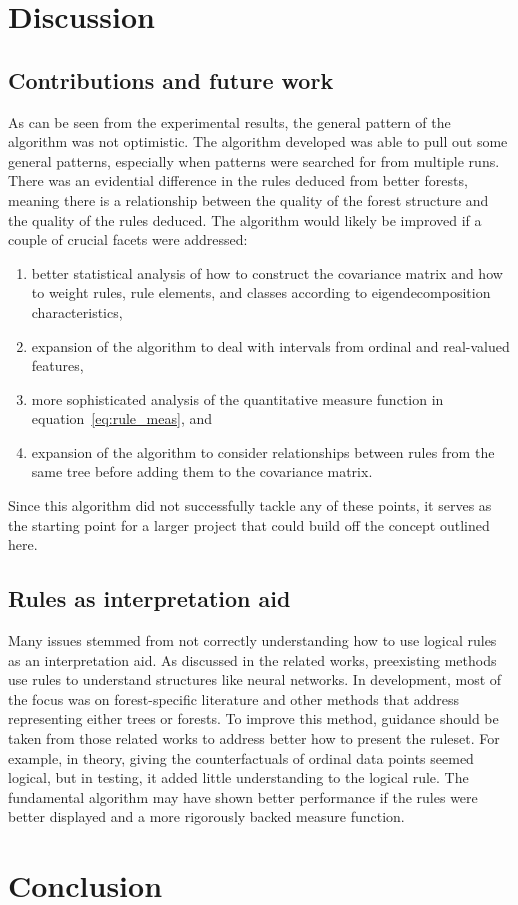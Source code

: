 \documentclass[10pt]{article}
\begin{document}

\section{Discussion}
\label{sec:dis}
\subsection{Contributions and future work}
As can be seen from the experimental results, the general pattern of the algorithm was not optimistic. The algorithm developed was able to pull out some general patterns, especially when patterns were searched for from multiple runs. There was an evidential difference in the rules deduced from better forests, meaning there is a relationship between the quality of the forest structure and the quality of the rules deduced. The algorithm would likely be improved if a couple of crucial facets were addressed:
\begin{enumerate}
\item better statistical analysis of how to construct the covariance matrix and how to weight rules, rule elements, and classes according to eigendecomposition characteristics, 
\item expansion of the algorithm to deal with intervals from ordinal and real-valued features,
\item more sophisticated analysis of the quantitative measure function in equation~\ref{eq:rule_meas}, and
\item expansion of the algorithm to consider relationships between rules from the same tree before adding them to the covariance matrix. 
\end{enumerate}
Since this algorithm did not successfully tackle any of these points, it serves as the starting point for a larger project that could build off the concept outlined here. 

\subsection{Rules as interpretation aid}
Many issues stemmed from not correctly understanding how to use logical rules as an interpretation aid. As discussed in the related works, preexisting methods use rules to understand structures like neural networks. In development, most of the focus was on forest-specific literature and other methods that address representing either trees or forests. To improve this method, guidance should be taken from those related works to address better how to present the ruleset. For example, in theory, giving the counterfactuals of ordinal data points seemed logical, but in testing, it added little understanding to the logical rule. The fundamental algorithm may have shown better performance if the rules were better displayed and a more rigorously backed measure function. 


\section{Conclusion}
\label{sec:conc}




\vskip 0.2in

\end{document}
